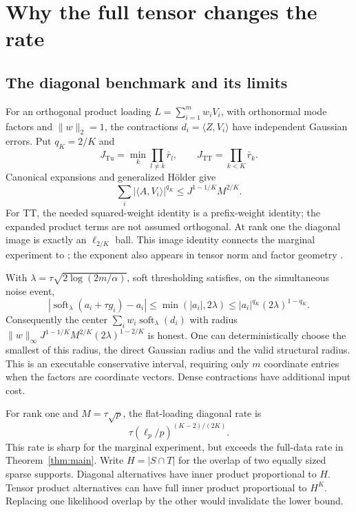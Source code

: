 \documentclass[11pt]{article}
\newcommand{\ip}[2]{\langle #1,#2\rangle}
\newcommand{\norm}[1]{\lVert #1\rVert}
\newcommand{\Tu}{\mathrm{Tu}}
\newcommand{\TT}{\mathrm{TT}}
\newcommand{\soft}{\operatorname{soft}}
\newcommand{\lp}{\ell_p}
\begin{document}
\section{Why the full tensor changes the rate}\label{sec:mechanism}
\subsection{The diagonal benchmark and its limits}
For an orthogonal product loading $L=\sum_{i=1}^m w_iV_i$, with orthonormal mode factors and $\norm w_2=1$, the contractions $d_i=\ip Z{V_i}$ have independent Gaussian errors. Put $q_K=2/K$ and
\[
 J_{\Tu}=\min_k\prod_{l\ne k}\bar r_l,\qquad J_{\TT}=\prod_{k<K}\bar r_k.
\]
Canonical expansions and generalized H\"older give
\begin{equation}\label{eq:compress}
 \sum_i|\ip A{V_i}|^{q_K}\le J^{1-1/K}M^{2/K}.
\end{equation}
For TT, the needed squared-weight identity is a prefix-weight identity; the expanded product terms are not assumed orthogonal. At rank one the diagonal image is exactly an $\ell_{2/K}$ ball. This image identity connects the marginal experiment to \citet{collier2017}; the exponent also appears in tensor norm and factor geometry \citep{friedlandlim2018,fan2023}.

With $\lambda=\tau\sqrt{2\log(2m/\alpha)}$, soft thresholding satisfies, on the simultaneous noise event,
\[
 |\soft_\lambda(a_i+\tau g_i)-a_i|
 \le\min(|a_i|,2\lambda)\le |a_i|^{q_K}(2\lambda)^{1-q_K}.
\]
Consequently the center $\sum_iw_i\soft_\lambda(d_i)$ with radius
$\norm w_\infty J^{1-1/K}M^{2/K}(2\lambda)^{1-2/K}$ is honest. One can deterministically choose the smallest of this radius, the direct Gaussian radius and the valid structural radius. This is an executable conservative interval, requiring only $m$ coordinate entries when the factors are coordinate vectors. Dense contractions have additional input cost.

For rank one and $M=\tau\sqrt p$, the flat-loading diagonal rate is
\[\tau(\lp/p)^{(K-2)/(2K)}.\] This rate is sharp for the marginal experiment, but exceeds the full-data rate in Theorem~\ref{thm:main}. Write $H=|S\cap T|$ for the overlap of two equally sized sparse supports. Diagonal alternatives have inner product proportional to $H$. Tensor product alternatives can have full inner product proportional to $H^K$. Replacing one likelihood overlap by the other would invalidate the lower bound.
\end{document}
